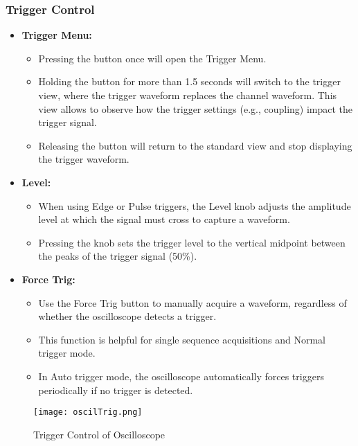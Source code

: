 \documentclass[12pt]{article}
\begin{document}
\subsubsection*{Trigger Control\cite{Theworki71:online}}
\begin{itemize}
    \item[] \textbf{Trigger Menu:}
          \begin{itemize}
              \item Pressing the button once will open the Trigger Menu.
              \item Holding the button for more than 1.5 seconds will switch to the trigger view, where the trigger waveform replaces the channel waveform. This view allows to observe how the trigger settings (e.g., coupling) impact the trigger signal.
              \item Releasing the button will return to the standard view and stop displaying the trigger waveform.
          \end{itemize}
    \item[] \textbf{Level:}
          \begin{itemize}
              \item When using Edge or Pulse triggers, the Level knob adjusts the amplitude level at which the signal must cross to capture a waveform.
              \item Pressing the knob sets the trigger level to the vertical midpoint between the peaks of the trigger signal (50\%).
          \end{itemize}
    \item[] \textbf{Force Trig:}
          \begin{itemize}
              \item Use the Force Trig button to manually acquire a waveform, regardless of whether the oscilloscope detects a trigger.
              \item This function is helpful for single sequence acquisitions and Normal trigger mode.
              \item In Auto trigger mode, the oscilloscope automatically forces triggers periodically if no trigger is detected.
          \end{itemize}
\end{itemize}

\begin{figure}[H]
    \centering
    \texttt{[image: oscilTrig.png]}
    \caption{Trigger Control of Oscilloscope}
\end{figure}
\end{document}
